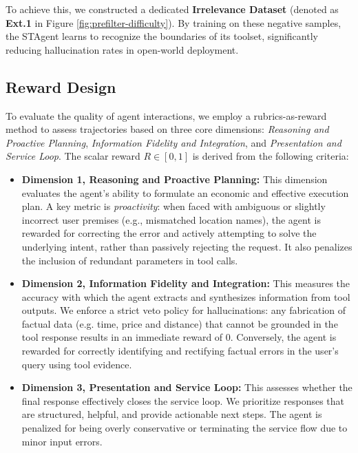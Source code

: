 \documentclass{article} %
\newcommand{\model}{STAgent\xspace}
\begin{document}
To achieve this, we constructed a dedicated \textbf{Irrelevance Dataset} (denoted as \textbf{Ext.1} in Figure \ref{fig:prefilter-difficulty}). By training on these negative samples, the \model learns to recognize the boundaries of its toolset, significantly reducing hallucination rates in open-world deployment.


    

    





\subsection{Reward Design}
\label{sec:reward}




To evaluate the quality of agent interactions, we employ a rubrics-as-reward~\citep{hashemi2024llm,gunjal2025rubrics} method to assess trajectories based on three core dimensions: \textit{Reasoning and Proactive Planning}, \textit{Information Fidelity and Integration}, and \textit{Presentation and Service Loop}. The scalar reward $R \in [0, 1]$ is derived from the following criteria:
\begin{itemize}
    \item \textbf{Dimension 1, Reasoning and Proactive Planning:} This dimension evaluates the agent's ability to formulate an economic and effective execution plan. A key metric is \textit{proactivity}: when faced with ambiguous or slightly incorrect user premises (e.g., mismatched location names), the agent is rewarded for correcting the error and actively attempting to solve the underlying intent, rather than passively rejecting the request. It also penalizes the inclusion of redundant parameters in tool calls.
    
    \item \textbf{Dimension 2, Information Fidelity and Integration:} This measures the accuracy with which the agent extracts and synthesizes information from tool outputs. We enforce a strict veto policy for hallucinations: any fabrication of factual data (e.g. time, price and distance) that cannot be grounded in the tool response results in an immediate reward of $0$. Conversely, the agent is rewarded for correctly identifying and rectifying factual errors in the user's query using tool evidence.
    
    \item \textbf{Dimension 3, Presentation and Service Loop:} This assesses whether the final response effectively closes the service loop. We prioritize responses that are structured, helpful, and provide actionable next steps. The agent is penalized for being overly conservative or terminating the service flow due to minor input errors.
\end{itemize}
\end{document}
